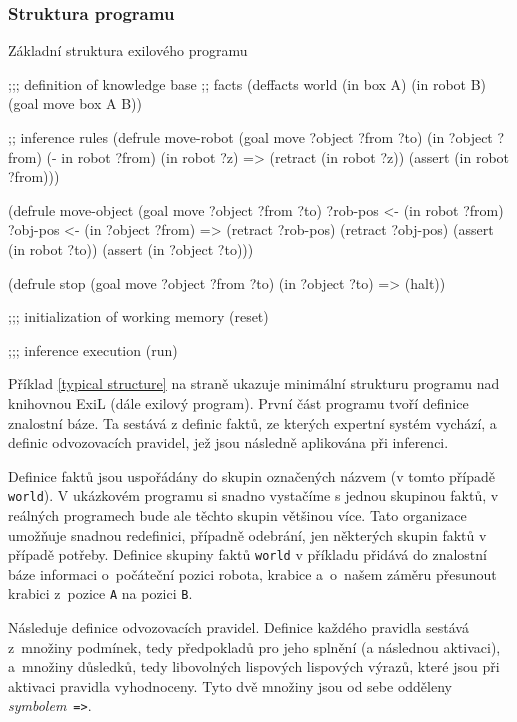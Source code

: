 \subsubsection{Struktura programu}

\begin{listing}[h]
\caption{Základní struktura exilového programu}
\label{typical structure}
\begin{clcode}
;;; definition of knowledge base
;; facts
(deffacts world
  (in box A)
  (in robot B)
  (goal move box A B))

;; inference rules
(defrule move-robot
  (goal move ?object ?from ?to)
  (in ?object ?from)
  (- in robot ?from)
  (in robot ?z)
  =>
  (retract (in robot ?z))
  (assert (in robot ?from)))

(defrule move-object
  (goal move ?object ?from ?to)
  ?rob-pos <- (in robot ?from)
  ?obj-pos <- (in ?object ?from)
  =>
  (retract ?rob-pos)
  (retract ?obj-pos)
  (assert (in robot ?to))
  (assert (in ?object ?to)))

(defrule stop
  (goal move ?object ?from ?to)
  (in ?object ?to)
  =>
  (halt))

;;; initialization of working memory
(reset)

;;; inference execution
(run)
\end{clcode}
\end{listing}

Příklad \ref{typical structure} na straně \pageref{typical structure} ukazuje
minimální strukturu programu nad knihovnou ExiL (dále exilový program). První
část programu tvoří definice znalostní báze. Ta sestává z definic faktů, ze
kterých expertní systém vychází, a definic odvozovacích pravidel, jež jsou
následně aplikována při inferenci.

Definice faktů jsou uspořádány do skupin označených názvem (v tomto případě
\verb|world|). V ukázkovém programu si snadno vystačíme s jednou skupinou faktů,
v reálných programech bude ale těchto skupin většinou více. Tato organizace
umožňuje snadnou redefinici, případně odebrání, jen některých skupin faktů v
případě potřeby.  Definice skupiny faktů \verb|world| v příkladu přidává do
znalostní báze informaci o~počáteční pozici robota, krabice a~o~našem záměru
přesunout krabici z~pozice \verb|A| na pozici \verb|B|.

Následuje definice odvozovacích pravidel. Definice každého pravidla sestává
z~množiny podmínek, tedy předpokladů pro jeho splnění (a následnou aktivaci),
a~množiny důsledků, tedy libovolných lispových lispových výrazů, které jsou při
aktivaci pravidla vyhodnoceny.  Tyto dvě množiny jsou od sebe odděleny
\emph{symbolem}~\verb|=>|.

